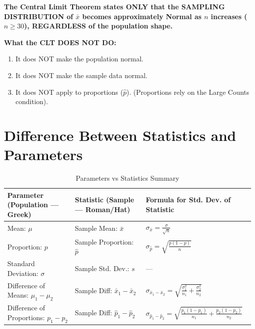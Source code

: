 \begin{trapbox}
\textbf{The Central Limit Theorem states ONLY that the SAMPLING DISTRIBUTION of $\bar{x}$ becomes approximately Normal as $n$ increases ($n \ge 30$), REGARDLESS of the population shape.}

\textbf{What the CLT DOES NOT DO:}
\begin{enumerate}
    \item It does NOT make the population normal.
    \item It does NOT make the sample data normal.
    \item It does NOT apply to proportions ($\hat{p}$). (Proportions rely on the Large Counts condition).
\end{enumerate}
\end{trapbox}

\section{Difference Between Statistics and Parameters}

\begin{table}[H]
\centering
\small
\begin{tabular}{@{}lll@{}}
\toprule
\textbf{Parameter (Population --- Greek)} & \textbf{Statistic (Sample --- Roman/Hat)} & \textbf{Formula for Std. Dev. of Statistic} \\
\midrule
Mean: $\mu$ & Sample Mean: $\bar{x}$ & $\sigma_{\bar{x}} = \frac{\sigma}{\sqrt{n}}$ \\
Proportion: $p$ & Sample Proportion: $\hat{p}$ & $\sigma_{\hat{p}} = \sqrt{\frac{p(1-p)}{n}}$ \\
Standard Deviation: $\sigma$ & Sample Std. Dev.: $s$ & --- \\
Difference of Means: $\mu_1 - \mu_2$ & Sample Diff: $\bar{x}_1 - \bar{x}_2$ & $\sigma_{\bar{x}_1 - \bar{x}_2} = \sqrt{\frac{\sigma_1^2}{n_1} + \frac{\sigma_2^2}{n_2}}$ \\
Difference of Proportions: $p_1 - p_2$ & Sample Diff: $\hat{p}_1 - \hat{p}_2$ & $\sigma_{\hat{p}_1 - \hat{p}_2} = \sqrt{\frac{p_1(1-p_1)}{n_1} + \frac{p_2(1-p_2)}{n_2}}$ \\
\bottomrule
\end{tabular}
\caption{Parameters vs Statistics Summary}
\end{table}
